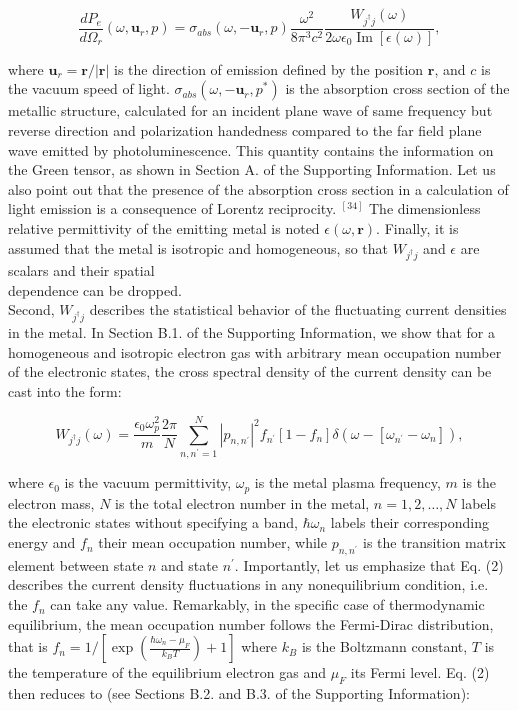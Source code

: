 \documentclass[10pt]{article}
\begin{document}
\begin{equation*}
\frac{d P_{e}}{d \Omega_{r}}\left(\omega, \boldsymbol{u}_{r}, p\right)=\sigma_{a b s}\left(\omega,-\boldsymbol{u}_{r}, p\right) \frac{\omega^{2}}{8 \pi^{3} c^{2}} \frac{W_{j^{\dagger} j}(\omega)}{2 \omega \epsilon_{0} \operatorname{Im}[\epsilon(\omega)]}, \tag{1}
\end{equation*}


where $\boldsymbol{u}_{r}=\boldsymbol{r} /|\boldsymbol{r}|$ is the direction of emission defined by the position $\boldsymbol{r}$, and $c$ is the vacuum speed of light. $\sigma_{a b s}\left(\omega,-\boldsymbol{u}_{r}, p^{*}\right)$ is the absorption cross section of the metallic structure, calculated for an incident plane wave of same frequency but reverse direction and polarization handedness compared to the far field plane wave emitted by photoluminescence. This quantity contains the information on the Green tensor, as shown in Section A. of the Supporting Information. Let us also point out that the presence of the absorption cross section in a calculation of light emission is a consequence of Lorentz reciprocity. ${ }^{[34]}$ The dimensionless relative permittivity of the emitting metal is noted $\epsilon(\omega, \boldsymbol{r})$. Finally, it is assumed that the metal is isotropic and homogeneous, so that $W_{j^{\dagger} j}$ and $\epsilon$ are scalars and their spatial\\
dependence can be dropped.\\
Second, $W_{j^{\dagger} j}$ describes the statistical behavior of the fluctuating current densities in the metal. In Section B.1. of the Supporting Information, we show that for a homogeneous and isotropic electron gas with arbitrary mean occupation number of the electronic states, the cross spectral density of the current density can be cast into the form:


\begin{equation*}
W_{j^{\dagger} j}(\omega)=\frac{\epsilon_{0} \omega_{p}^{2}}{m} \frac{2 \pi}{N} \sum_{n, n^{\prime}=1}^{N}\left|p_{n, n^{\prime}}\right|^{2} f_{n^{\prime}}\left[1-f_{n}\right] \delta\left(\omega-\left[\omega_{n^{\prime}}-\omega_{n}\right]\right), \tag{2}
\end{equation*}


where $\epsilon_{0}$ is the vacuum permittivity, $\omega_{p}$ is the metal plasma frequency, $m$ is the electron mass, $N$ is the total electron number in the metal, $n=1,2, \ldots, N$ labels the electronic states without specifying a band, $\hbar \omega_{n}$ labels their corresponding energy and $f_{n}$ their mean occupation number, while $p_{n, n^{\prime}}$ is the transition matrix element between state $n$ and state $n^{\prime}$. Importantly, let us emphasize that Eq. (2) describes the current density fluctuations in any nonequilibrium condition, i.e. the $f_{n}$ can take any value. Remarkably, in the specific case of thermodynamic equilibrium, the mean occupation number follows the Fermi-Dirac distribution, that is $f_{n}=1 /\left[\exp \left(\frac{\hbar \omega_{n}-\mu_{F}}{k_{B} T}\right)+1\right]$ where $k_{B}$ is the Boltzmann constant, $T$ is the temperature of the equilibrium electron gas and $\mu_{F}$ its Fermi level. Eq. (2) then reduces to (see Sections B.2. and B.3. of the Supporting Information):
\end{document}
